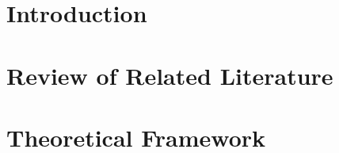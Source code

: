
\ClearWallPaper







%







\begin{SingleSpace}	
	\listoffigures
	\cleardoublepage
	
	\listoftables
	\cleardoublepage

\end{SingleSpace}

\DoubleSpacing
\mainmatter

\chapter{Introduction}
\Mprintcontents
	\label{ch:intro}
	
	\clearpage

\chapter{Review of Related Literature} 
\Mprintcontents
	\label{ch:rrl} 
	
	\clearpage

\chapter{Theoretical Framework} 
\Mprintcontents
	\label{ch:theory} 
	
	\clearpage

